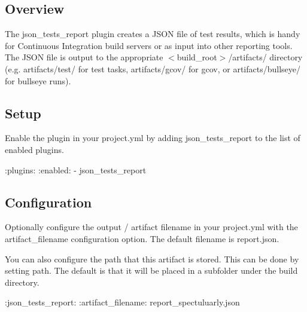 \subsection*{Overview}

The json\+\_\+tests\+\_\+report plugin creates a J\+S\+ON file of test results, which is handy for Continuous Integration build servers or as input into other reporting tools. The J\+S\+ON file is output to the appropriate {\ttfamily $<$build\+\_\+root$>$/artifacts/} directory (e.\+g. {\ttfamily artifacts/test/} for test tasks, {\ttfamily artifacts/gcov/} for gcov, or {\ttfamily artifacts/bullseye/} for bullseye runs).

\subsection*{Setup}

Enable the plugin in your project.\+yml by adding {\ttfamily json\+\_\+tests\+\_\+report} to the list of enabled plugins.


\begin{DoxyCode}
:plugins:
  :enabled:
    - json\_tests\_report
\end{DoxyCode}


\subsection*{Configuration}

Optionally configure the output / artifact filename in your project.\+yml with the {\ttfamily artifact\+\_\+filename} configuration option. The default filename is {\ttfamily report.\+json}.

You can also configure the path that this artifact is stored. This can be done by setting {\ttfamily path}. The default is that it will be placed in a subfolder under the {\ttfamily build} directory.


\begin{DoxyCode}
:json\_tests\_report:
  :artifact\_filename: report\_spectuluarly.json
\end{DoxyCode}
 